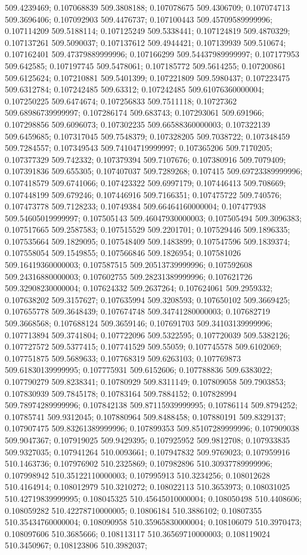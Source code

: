 509.4239469; 0.107068839 509.3808188; 0.107078675 509.4306709; 0.107074713 509.3696406; 0.107092903 509.4476737; 0.107100443 509.45709589999996; 0.107114209 509.5188114; 0.107125249 509.5338441; 0.107124819 509.4870329; 0.107137261 509.5090037; 0.107137612 509.4944421; 0.107139939 509.510674; 0.107162401 509.47379889999996; 0.107166299 509.54437989999997; 0.107177953 509.642585; 0.107197745 509.5478061; 0.107185772 509.5614255; 0.107200861 509.6125624; 0.107210881 509.5401399; 0.107221809 509.5980437; 0.107223475 509.6312784; 0.107242485 509.63312; 0.107242485 509.61076360000004; 0.107250225 509.6474674; 0.107256833 509.7511118; 0.10727362 509.68986739999997; 0.107286174 509.683743; 0.107293061 509.691966; 0.107298856 509.6096073; 0.107302235 509.66588360000003; 0.107322139 509.6459685; 0.107317045 509.7548379; 0.107328205 509.7038722; 0.107348459 509.7284557; 0.107349543 509.74104719999997; 0.107365206 509.7170205; 0.107377329 509.742332; 0.107379394 509.7107676; 0.107380916 509.7079409; 0.107391836 509.655305; 0.107407037 509.7289268; 0.107415 509.69723389999996; 0.107418579 509.6741066; 0.107423322 509.6997179; 0.107446413 509.708669; 0.107448199 509.679246; 0.107446916 509.7166351; 0.107475722 509.740576; 0.107473778 509.7128233; 0.10749384 509.66464160000004; 0.107477938 509.54605019999997; 0.107505143 509.46047930000003; 0.107505494 509.3096383; 0.107517665 509.2587583; 0.107515529 509.2201701; 0.107529446 509.1896335; 0.107535664 509.1829095; 0.107548409 509.1483899; 0.107547596 509.1839374; 0.107558054 509.1549855; 0.107566846 509.1826954; 0.107581026 509.16419360000003; 0.107587515 509.20513739999996; 0.107592608 509.24316880000003; 0.107602755 509.28231389999996; 0.107621726 509.32908230000004; 0.107624332 509.2637264; 0.107624061 509.2959332; 0.107638202 509.3157627; 0.107635994 509.3208593; 0.107650102 509.3669425; 0.107655778 509.3648439; 0.107674748 509.34741280000003; 0.107682719 509.3668568; 0.107688124 509.3659146; 0.107691703 509.34103139999996; 0.107713894 509.3741804; 0.107722096 509.5322595; 0.107720039 509.5382126; 0.107727572 509.5377415; 0.107741529 509.55059; 0.107745578 509.6102069; 0.107751875 509.5689633; 0.107768319 509.6263103; 0.107769873 509.61830139999995; 0.107775931 509.6152606; 0.107788836 509.6383022; 0.107790279 509.8238341; 0.10780929 509.8311149; 0.107809058 509.7903853; 0.107830939 509.7845178; 0.10783164 509.7884152; 0.107828994 509.78974289999996; 0.107842138 509.87115939999995; 0.10786114 509.8794252; 0.10785741 509.9312045; 0.107880964 509.8488458; 0.107880191 509.8329137; 0.107907475 509.83261389999996; 0.107899353 509.85107289999996; 0.107909038 509.9047367; 0.107919025 509.9429395; 0.107925952 509.9812708; 0.107933835 509.9327035; 0.107941264 510.0093661; 0.107947832 509.9769023; 0.107959916 510.1463736; 0.107976902 510.2325869; 0.107982896 510.30937789999996; 0.107998942 510.35122110000003; 0.107995913 510.3234256; 0.108012628 510.4164914; 0.108012979 510.3210272; 0.108022113 510.3653973; 0.108031025 510.42719839999995; 0.108045325 510.45645010000004; 0.108050498 510.4408606; 0.108059282 510.42278710000005; 0.10806184 510.3886102; 0.10807355 510.35434760000004; 0.108090958 510.35965830000004; 0.108106079 510.3970473; 0.108097606 510.3685666; 0.108113117 510.36569710000003; 0.108119024 510.3450967; 0.108123806 510.3982037; 
